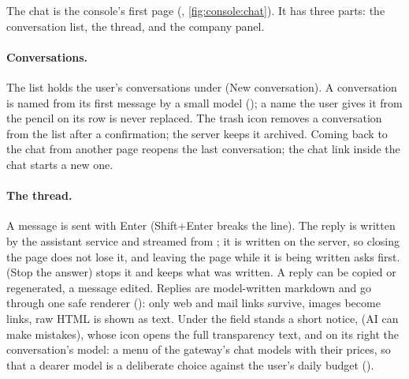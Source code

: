 The chat is the console's first page (, \cref{fig:console:chat}).
It has three parts: the conversation list, the thread, and the company panel.

\paragraph{Conversations.} The list holds the user's conversations under
 (New conversation). A conversation is named from its first message by a
small model (); a name the user gives it from the pencil on its row is never
replaced. The trash icon removes a conversation from the list after a confirmation; the server
keeps it archived. Coming back to the chat from another page reopens the last conversation;
the chat link inside the chat starts a new one.

\paragraph{The thread.} A message is sent with Enter (Shift+Enter breaks the line). The reply
is written by the assistant service and streamed from ; it is
written on the server, so closing the page does not lose it, and leaving the page while it is
being written asks first.  (Stop the answer) stops it and keeps what was
written. A reply can be copied or regenerated, a message edited. Replies are model-written
markdown and go through one safe renderer (): only web
and mail links survive, images become links, raw HTML is shown as text.
Under the field stands a short notice,  (AI can make mistakes), whose icon
opens the full transparency text, and on its right the conversation's model: a menu of the
gateway's chat models with their prices, so that a dearer model is a deliberate choice against
the user's daily budget ().

